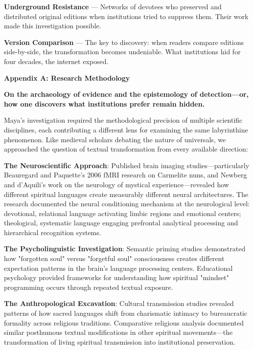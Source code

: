 \documentclass[12pt,twoside]{book}
\begin{document}
\textbf{\textbf{Underground Resistance}} — Networks of devotees who preserved and distributed original editions when institutions tried to suppress them. Their work made this investigation possible.

\textbf{\textbf{Version Comparison}} — The key to discovery: when readers compare editions side-by-side, the transformation becomes undeniable. What institutions hid for four decades, the internet exposed.

\clearpage
\thispagestyle{empty}
\mbox{}
\newpage
\pagestyle{sectionopening}
\thispagestyle{sectionopening}
\markboth{}{}
\markright{}
\vspace*{0.25\textheight}
\begin{center}
{\Huge\bfseries Appendix A: Research Methodology}
\end{center}
\newpage

\textbf{On the archaeology of evidence and the epistemology of detection—or, how one discovers what institutions prefer remain hidden.}

Maya's investigation required the methodological precision of multiple scientific disciplines, each contributing a different lens for examining the same labyrinthine phenomenon. Like medieval scholars debating the nature of universals, we approached the question of textual transformation from every available direction:

\textbf{\textbf{The Neuroscientific Approach}}: Published brain imaging studies—particularly Beauregard and Paquette's 2006 fMRI research on Carmelite nuns, and Newberg and d'Aquili's work on the neurology of mystical experience—revealed how different spiritual languages create measurably different neural architectures. The research documented the neural conditioning mechanism at the neurological level: devotional, relational language activating limbic regions and emotional centers; theological, systematic language engaging prefrontal analytical processing and hierarchical recognition systems.

\textbf{\textbf{The Psycholinguistic Investigation}}: Semantic priming studies demonstrated how "forgotten soul" versus "forgetful soul" consciousness creates different expectation patterns in the brain's language processing centers. Educational psychology provided frameworks for understanding how spiritual "mindset" programming occurs through repeated textual exposure.

\textbf{\textbf{The Anthropological Excavation}}: Cultural transmission studies revealed patterns of how sacred languages shift from charismatic intimacy to bureaucratic formality across religious traditions. Comparative religious analysis documented similar posthumous textual modifications in other spiritual movements—the transformation of living spiritual transmission into institutional preservation.
\end{document}
